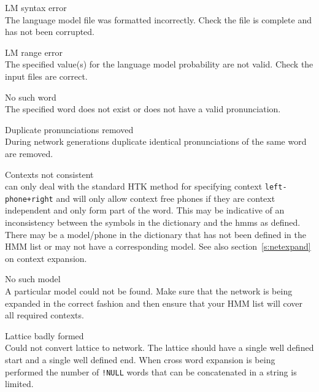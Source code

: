 \begin{itemize}
\begin{itemize}
\end{itemize}


\begin{itemize}
    LM syntax error\\
        The language model file was formatted incorrectly.  Check the file is
        complete and has not been corrupted.

 LM range error\\
        The specified value(s) for the language model probability are not 
        valid.  Check the input files are correct.

\end{itemize}


\begin{itemize}
    No such word\\
        The specified word does not exist or does not have a valid 
        pronunciation.

    Duplicate pronunciations removed\\
        During network generations duplicate identical pronunciations
        of the same word are removed.

    Contexts not consistent\\
         can only deal with the standard HTK method for specifying
        context \texttt{left-phone+right} and will only allow context free 
        phones if they are context independent and only form part of the word.
        This may be indicative of an inconsistency between the symbols in the dictionary
        and the hmms as defined. There may be a model/phone in the dictionary that has 
        not been defined in the HMM list or may not have a corresponding model.
        See also section~\ref{s:netexpand}  on context expansion.


    No such model\\
        A particular model could not be found.  Make sure that the network is
        being expanded in the correct fashion and then ensure that your HMM
        list will cover all required contexts.

    Lattice badly formed\\
        Could not convert lattice to network.  The lattice should have a single
        well defined start and a single well defined end.  When cross word 
        expansion is being performed the number of \texttt{!NULL} words that 
        can be concatenated in a string is limited.


\end{itemize}
\end{itemize}
